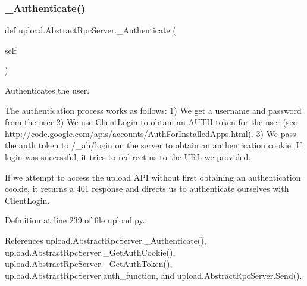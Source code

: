 \mbox{\label{classupload_1_1AbstractRpcServer_a8517a9d90ee2478752a53302f01d868d}} 
\subsubsection{\texorpdfstring{\+\_\+\+Authenticate()}{\_Authenticate()}\hspace{0.1cm}{\footnotesize\ttfamily [2/2]}}
{\footnotesize\ttfamily def upload.\+Abstract\+Rpc\+Server.\+\_\+\+Authenticate (\begin{DoxyParamCaption}\item[{}]{self }\end{DoxyParamCaption})\hspace{0.3cm}{\ttfamily [private]}}

\begin{DoxyVerb}Authenticates the user.

The authentication process works as follows:
 1) We get a username and password from the user
 2) We use ClientLogin to obtain an AUTH token for the user
(see http://code.google.com/apis/accounts/AuthForInstalledApps.html).
 3) We pass the auth token to /_ah/login on the server to obtain an
authentication cookie. If login was successful, it tries to redirect
us to the URL we provided.

If we attempt to access the upload API without first obtaining an
authentication cookie, it returns a 401 response and directs us to
authenticate ourselves with ClientLogin.
\end{DoxyVerb}
 

Definition at line 239 of file upload.\+py.



References upload.\+Abstract\+Rpc\+Server.\+\_\+\+Authenticate(), upload.\+Abstract\+Rpc\+Server.\+\_\+\+Get\+Auth\+Cookie(), upload.\+Abstract\+Rpc\+Server.\+\_\+\+Get\+Auth\+Token(), upload.\+Abstract\+Rpc\+Server.\+auth\+\_\+function, and upload.\+Abstract\+Rpc\+Server.\+Send().


